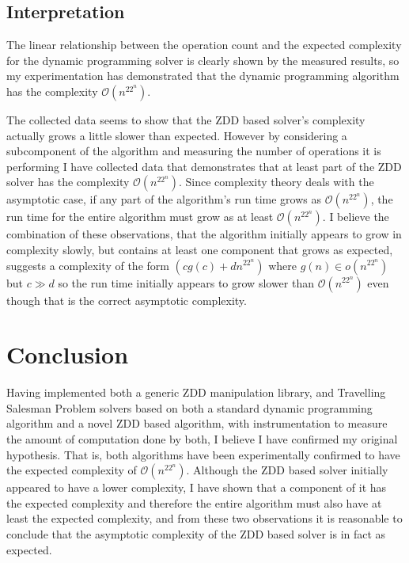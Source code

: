 \documentclass[12pt,a4paper,twoside,openright]{report}
\begin{document}
\section{Interpretation}
The linear relationship between the operation count and the expected complexity for the dynamic programming solver is clearly shown by the measured results, so my experimentation has demonstrated that the dynamic programming algorithm has the complexity $\mathcal{O}(n^22^n)$.

The collected data seems to show that the ZDD based solver's complexity actually grows a little slower than expected. However by considering a subcomponent of the algorithm and measuring the number of operations it is performing I have collected data that demonstrates that at least part of the ZDD solver has the complexity $\mathcal{O}(n^22^n)$. Since complexity theory deals with the asymptotic case, if any part of the algorithm's run time grows as $\mathcal{O}(n^22^n)$, the run time for the entire algorithm must grow as at least $\mathcal{O}(n^22^n)$. I believe the combination of these observations, that the algorithm initially appears to grow in complexity slowly, but contains at least one component that grows as expected, suggests a complexity of the form $(cg(c) + dn^22^n)$ where $g(n)\in o(n^22^n)$ but $c \gg d$ so the run time initially appears to grow slower than $\mathcal{O}(n^22^n)$ even though that is the correct asymptotic complexity. 

\chapter{Conclusion}
Having implemented both a generic ZDD manipulation library, and Travelling Salesman Problem solvers based on both a standard dynamic programming algorithm and a novel ZDD based algorithm, with instrumentation to measure the amount of computation done by both, I believe I have confirmed my original hypothesis. That is, both algorithms have been experimentally confirmed to have the expected complexity of $\mathcal{O}(n^22^n)$. Although the ZDD based solver initially appeared to have a lower complexity, I have shown that a component of it has the expected complexity and therefore the entire algorithm must also have at least the expected complexity, and from these two observations it is reasonable to conclude that the asymptotic complexity of the ZDD based solver is in fact as expected.
\end{document}
